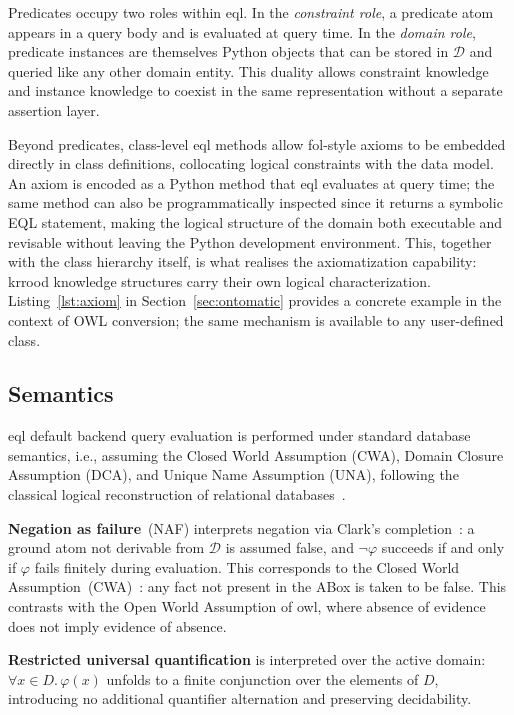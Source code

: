 \documentclass[a4paper,fleqn]{cas-sc}
\begin{document}
Predicates occupy two roles within \ac{eql}. In the \emph{constraint role},
a predicate atom appears in a query body and is evaluated at query time. In
the \emph{domain role}, predicate instances are themselves Python objects that
can be stored in $\mathcal{D}$ and queried like any other domain entity. This
duality allows constraint knowledge and instance knowledge to coexist in the
same representation without a separate assertion layer.

Beyond predicates, class-level \ac{eql} methods allow \ac{fol}-style axioms
to be embedded directly in class definitions, collocating logical constraints
with the data model. An axiom is encoded as a Python method that \ac{eql} evaluates at query
time; the same method can also be programmatically inspected since it returns a symbolic EQL statement, making the logical structure of
the domain both executable and revisable without leaving the Python
development environment. This, together with the class hierarchy itself, is what realises the
axiomatization capability: \ac{krrood} knowledge structures carry their own logical characterization. Listing~\ref{lst:axiom} in Section~\ref{sec:ontomatic}
provides a concrete example in the context of OWL conversion; the same
mechanism is available to any user-defined class.


\subsection{Semantics}
\label{ssec:eql_semantics}

\ac{eql} default backend query evaluation is performed under standard database semantics, i.e., assuming the Closed World Assumption (CWA), Domain Closure Assumption (DCA), and Unique Name Assumption (UNA), following the classical logical reconstruction of relational databases~\citep{Reiter1978,reiter1984relational}.

\textbf{Negation as failure}~(NAF) interprets negation via Clark's
completion~\citep{ClarkCompletion1978}: a ground atom not derivable from
$\mathcal{D}$ is assumed false, and $\neg\varphi$ succeeds if and only if
$\varphi$ fails finitely during evaluation. This corresponds to the Closed
World Assumption~(CWA)~\citep{Reiter1978}: any fact not present in the ABox is
taken to be false. This contrasts with the Open World Assumption of \ac{owl},
where absence of evidence does not imply evidence of absence. 

\textbf{Restricted universal quantification} is interpreted over the active
domain: $\forall x \in D.\,\varphi(x)$ unfolds to a finite conjunction over
the elements of $D$, introducing no additional quantifier alternation and
preserving decidability.
\end{document}
